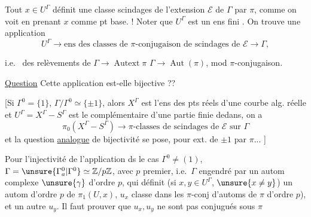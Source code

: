  Tout $x\in U^\Gamma$ définit une classe   scindages de l'extension $\mathcal E$ de $\Gamma$ par $\pi$, comme on voit en prenant $x$ comme pt base. ! Noter que $U^\Gamma$ est un ens fini .
On trouve  une application
\[
U^\Gamma\longrightarrow\text{ens des classes de }\pi\text{-conjugaison de scindages de }\mathcal E\longrightarrow\Gamma,
\]


i.e.\  des relèvements de $\Gamma\longrightarrow\operatorname{Autext}\pi$  $\Gamma\longrightarrow\operatorname{Aut}(\pi)$, mod $\pi$-conjugaison.

\uline{Question}  Cette application est-elle bijective ??

[Si $\Gamma^0=\{1\}$, $\Gamma/\Gamma^0\simeq\{\pm1\}$, alors $X^\Gamma$ est l'ens des pts réels d'une courbe alg. réelle et $U^\Gamma=X^\Gamma-S^\Gamma$ est le complémentaire d'une partie finie dedans, on a
\[
\pi_0(X^\Gamma-S^\Gamma)\longrightarrow
\pi\text{-classes de scindages de }\mathcal E\text{ sur }\Gamma
\]
et la  question \uline{analogue} de bijectivité se pose, pour ext. de $\pm1$ par $\pi$... ]

Pour l'injectivité de l'application ds le cas $\Gamma^0\ne(1)$,  $\Gamma=\unsure{\Gamma^0_a|\Gamma^0}\simeq\mathbb Z/p\mathbb Z$, avec $p$ premier, i.e.\ $\Gamma$ engendré par un autom complexe $\unsure{\gamma}$ d'ordre $p$, qui définit (si $x,y\in U^\Gamma$, $\unsure{x\ne y}$) un autom d'ordre $p$ de $\pi_1(U,x)$,  $u_x$   classe dans les $\pi$-conj d'automs de $\pi$ d'ordre $p$), et un autre $u_y$.
Il faut prouver que $u_x,u_y$ ne sont pas conjugués sous $\pi$


